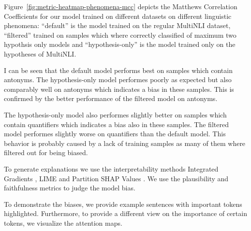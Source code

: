 Figure~\ref{fig:metric-heatmap-phenomena-mcc} depicts the Matthews Correlation Coefficients for our model trained on different datasets on different linguistic phenomena: \enquote{default} is the model trained on the regular \ac{MultiNLI} dataset, \enquote{filtered} trained on samples which where correctly classified of maximum two hypothsis only models and \enquote{hypothesis-only} is the model trained only on the hypotheses of \ac{MultiNLI}.

I can be seen that the default model performs best on samples which contain antonyms. The hypothesis-only model performes poorly as expected but also comparably well on antonyms which indicates a bias in these samples. This is confirmed by the better performance of the filtered model on antonyms.

The hypothesis-only model also performes slightly better on samples which contain quantifiers which indicates a bias also in these samples. The filtered model performes slightly worse on quantifiers than the default model. This behavior is probably caused by a lack of training samples as many of them where filtered out for being biased.

To generate explanations we use the interpretability methods Integrated Gradients \cite{integratedgradients}, \ac{LIME} \cite{lime} and Partition SHAP Values \cite{shap}. We use the plausibility and faithfulness \cite{ferret} metrics to judge the model bias.

To demonstrate the biases, we provide example sentences with important tokens highlighted. Furthermore, to provide a different view on the importance of certain tokens, we visualize the attention maps.